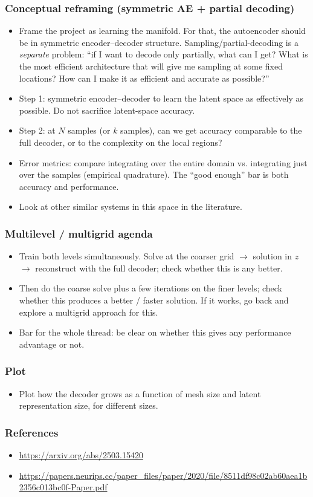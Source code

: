 \subsubsection*{Conceptual reframing (symmetric AE + partial decoding)}
\begin{itemize}
  \item Frame the project as learning the manifold. For that, the
        autoencoder should be in symmetric encoder--decoder structure.
        Sampling/partial-decoding is a \emph{separate} problem:
        ``if I want to decode only partially, what can I get? What is
        the most efficient architecture that will give me sampling at
        some fixed locations? How can I make it as efficient and
        accurate as possible?''
  \item Step 1: symmetric encoder--decoder to learn the latent space as
        effectively as possible. Do not sacrifice latent-space accuracy.
  \item Step 2: at $N$ samples (or $k$ samples), can we get accuracy
        comparable to the full decoder, or to the complexity on the
        local regions?
  \item Error metrics: compare integrating over the entire domain vs.
        integrating just over the samples (empirical quadrature). The
        ``good enough'' bar is both accuracy and performance.
  \item Look at other similar systems in this space in the literature.
\end{itemize}

\subsubsection*{Multilevel / multigrid agenda}
\begin{itemize}
  \item Train both levels simultaneously. Solve at the coarser grid
        $\rightarrow$ solution in $z$ $\rightarrow$ reconstruct with
        the full decoder; check whether this is any better.
  \item Then do the coarse solve plus a few iterations on the finer
        levels; check whether this produces a better / faster solution.
        If it works, go back and explore a multigrid approach for this.
  \item Bar for the whole thread: be clear on whether this gives any
        performance advantage or not.
\end{itemize}

\subsubsection*{Plot}
\begin{itemize}
  \item Plot how the decoder grows as a function of mesh size and
        latent representation size, for different sizes.
\end{itemize}

\subsubsection*{References}
\begin{itemize}
  \item \url{https://arxiv.org/abs/2503.15420}
  \item \url{https://papers.neurips.cc/paper_files/paper/2020/file/8511df98c02ab60aea1b2356c013bc0f-Paper.pdf}
\end{itemize}
